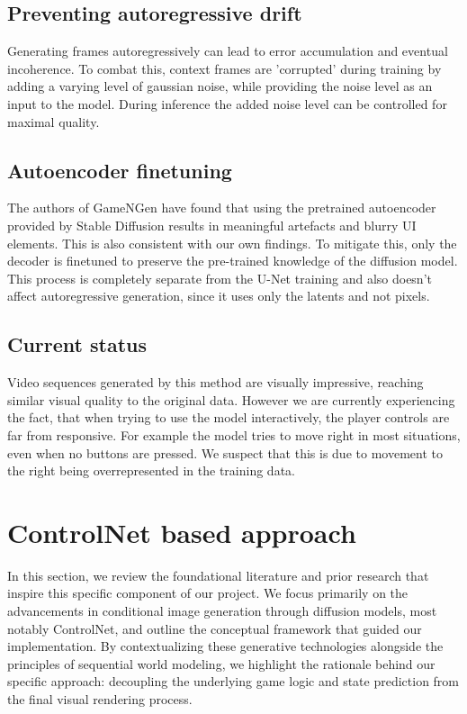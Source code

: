 \documentclass[twocolumn,a4paper]{article}
\begin{document}
\subsection{Preventing autoregressive drift}
Generating frames autoregressively can lead to error accumulation and eventual incoherence. To combat this, context frames are 'corrupted' during training by adding a varying level of gaussian noise, while providing the noise level as an input to the model. During inference the added noise level can be controlled for maximal quality.

\subsection{Autoencoder finetuning}
The authors of GameNGen have found that using the pretrained autoencoder provided by Stable Diffusion results in meaningful artefacts and blurry UI elements. This is also consistent with our own findings. To mitigate this, only the decoder is finetuned to preserve the pre-trained knowledge of the diffusion model. This process is completely separate from the U-Net training and also doesn't affect autoregressive generation, since it uses only the latents and not pixels.

\subsection{Current status}

Video sequences generated by this method are visually impressive, reaching similar visual quality to the original data. However we are currently experiencing the fact, that when trying to use the model interactively, the player controls are far from responsive. For example the model tries to move right in most situations, even when no buttons are pressed. We suspect that this is due to movement to the right being overrepresented in the training data.


\section{ControlNet based approach}
\label{controlnet}

In this section, we review the foundational literature and prior research that inspire this specific component of our project. We focus primarily on the advancements in conditional image generation through diffusion models, most notably ControlNet, and outline the conceptual framework that guided our implementation. By contextualizing these generative technologies alongside the principles of sequential world modeling, we highlight the rationale behind our specific approach: decoupling the underlying game logic and state prediction from the final visual rendering process.
\end{document}
